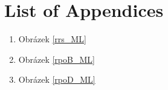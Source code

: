 \chapter*{List of Appendices}

\begin{enumerate}
\item Obrázek \ref{rrs_ML}
\item Obrázek \ref{rpoB_ML}
\item Obrázek \ref{rpoD_ML}
\end{enumerate}

%

%

